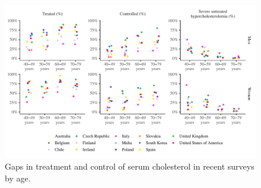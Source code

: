 \documentclass[12pt]{article}
\begin{document}
\begin{refsection}
\begin{landscape}
    \begin{figure}[p]
        \centering
        \includegraphics{../3_figures/age_gaps.pdf}
        \caption{Gaps in treatment and control of serum cholesterol in recent surveys by age.}
        \label{fig:gaps}
    \end{figure}
\end{landscape}


\clearpage 



\end{refsection}
\end{document}

